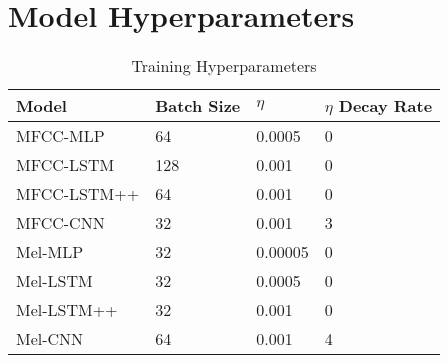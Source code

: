 \chapter{Model Hyperparameters}
\label{appendix:hyperparams}

\begin{table}[h]
\caption{Training Hyperparameters}
\centering
\begin{tabular}{l|l|l|l}
Model       & Batch Size & $\eta$ & $\eta$ Decay Rate \\
\toprule
MFCC-MLP    & 64         & 0.0005                & 0                        \\
MFCC-LSTM   & 128        & 0.001                 & 0                        \\
MFCC-LSTM++ & 64         & 0.001                 & 0                        \\
MFCC-CNN    & 32         & 0.001                 & 3                        \\
Mel-MLP     & 32         & 0.00005               & 0                        \\
Mel-LSTM    & 32         & 0.0005                & 0                        \\
Mel-LSTM++  & 32         & 0.001                 & 0                        \\
Mel-CNN     & 64         & 0.001                 & 4                        \\
\bottomrule
\end{tabular}
\end{table}